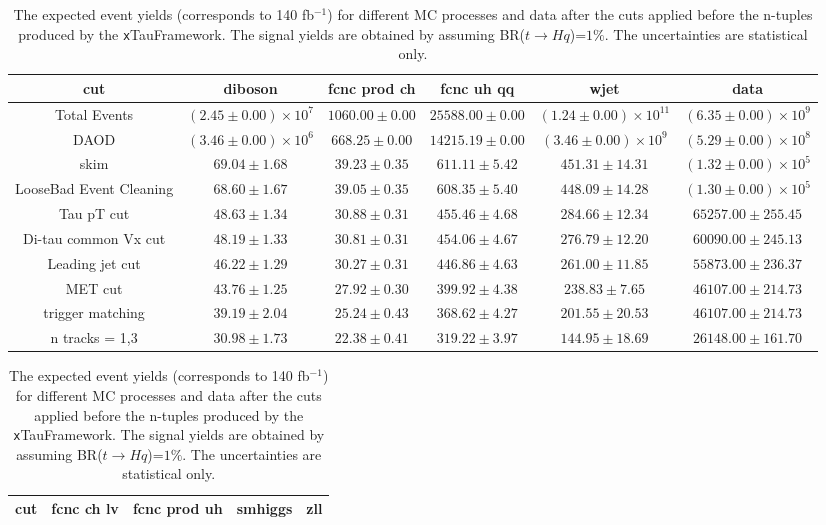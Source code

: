 \begin{table}
\footnotesize
\caption{ The expected event yields (corresponds to 140 fb$^{-1}$) for different MC processes and data after the cuts applied before the n-tuples produced by the {\texttt xTauFramework}. The signal yields are obtained by assuming BR($t\to Hq$)=$1\%$. The uncertainties are statistical only.}
\centering
\begin{tabular}{|c|c|c|c|c|c|} \hline

cut & diboson & fcnc prod ch & fcnc uh qq & wjet & data\\ \hline
Total Events & $( 2.45 \pm 0.00 ) \times 10^{7}$ & $1060.00 \pm 0.00$ & $25588.00 \pm 0.00$ & $( 1.24 \pm 0.00 ) \times 10^{11}$ & $( 6.35 \pm 0.00 ) \times 10^{9}$\\ \hline
DAOD & $( 3.46 \pm 0.00 ) \times 10^{6}$ & $668.25 \pm 0.00$ & $14215.19 \pm 0.00$ & $( 3.46 \pm 0.00 ) \times 10^{9}$ & $( 5.29 \pm 0.00 ) \times 10^{8}$\\ \hline
skim & $69.04 \pm 1.68$ & $39.23 \pm 0.35$ & $611.11 \pm 5.42$ & $451.31 \pm 14.31$ & $( 1.32 \pm 0.00 ) \times 10^{5}$\\ \hline
LooseBad Event Cleaning & $68.60 \pm 1.67$ & $39.05 \pm 0.35$ & $608.35 \pm 5.40$ & $448.09 \pm 14.28$ & $( 1.30 \pm 0.00 ) \times 10^{5}$\\ \hline
Tau pT cut & $48.63 \pm 1.34$ & $30.88 \pm 0.31$ & $455.46 \pm 4.68$ & $284.66 \pm 12.34$ & $65257.00 \pm 255.45$\\ \hline
Di-tau common Vx cut & $48.19 \pm 1.33$ & $30.81 \pm 0.31$ & $454.06 \pm 4.67$ & $276.79 \pm 12.20$ & $60090.00 \pm 245.13$\\ \hline
Leading jet cut & $46.22 \pm 1.29$ & $30.27 \pm 0.31$ & $446.86 \pm 4.63$ & $261.00 \pm 11.85$ & $55873.00 \pm 236.37$\\ \hline
MET cut & $43.76 \pm 1.25$ & $27.92 \pm 0.30$ & $399.92 \pm 4.38$ & $238.83 \pm 7.65$ & $46107.00 \pm 214.73$\\ \hline
trigger matching & $39.19 \pm 2.04$ & $25.24 \pm 0.43$ & $368.62 \pm 4.27$ & $201.55 \pm 20.53$ & $46107.00 \pm 214.73$\\ \hline
n tracks = 1,3 & $30.98 \pm 1.73$ & $22.38 \pm 0.41$ & $319.22 \pm 3.97$ & $144.95 \pm 18.69$ & $26148.00 \pm 161.70$\\ \hline
\end{tabular}
\label{tab:yields_hh_1}
\begin{tabular}{|c|c|c|c|c|} \hline
cut & fcnc ch lv & fcnc prod uh & smhiggs & zll\\ \hline

\end{tabular}
\end{table}
